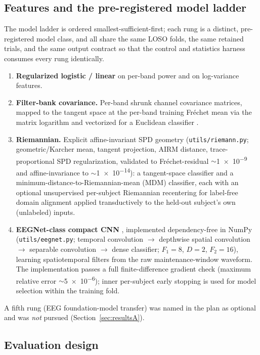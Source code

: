 \documentclass[11pt]{article}
\begin{document}
\subsection{Features and the pre-registered model ladder}
\label{sec:methods-models}
The model ladder is ordered smallest-sufficient-first; each rung is a distinct, pre-registered
model class, and all share the same LOSO folds, the same retained trials, and the same output
contract so that the control and statistics harness consumes every rung identically.
\begin{enumerate}[nosep]
  \item \textbf{Regularized logistic / linear} on per-band power and on log-variance features.
  \item \textbf{Filter-bank covariance.} Per-band shrunk channel covariance matrices, mapped to the
  tangent space at the per-band training Fr\'echet mean via the matrix logarithm and vectorized
  for a Euclidean classifier \cite{barachant2012multiclass}.
  \item \textbf{Riemannian.} Explicit affine-invariant SPD geometry (\texttt{utils/riemann.py};
  geometric/Karcher mean, tangent projection, AIRM distance, trace-proportional SPD
  regularization, validated to Fr\'echet-residual $\sim$\num{1e-9} and affine-invariance to
  $\sim$\num{1e-14}): a tangent-space classifier and a minimum-distance-to-Riemannian-mean (MDM)
  classifier, each with an optional unsupervised per-subject Riemannian recentering for label-free
  domain alignment \cite{zanini2018transfer} applied transductively to the held-out subject's own
  (unlabeled) inputs.
  \item \textbf{EEGNet-class compact CNN} \cite{lawhern2018eegnet}, implemented dependency-free in
  NumPy (\texttt{utils/eegnet.py}; temporal convolution $\rightarrow$ depthwise spatial convolution
  $\rightarrow$ separable convolution $\rightarrow$ dense classifier; $F_1=8$, $D=2$, $F_2=16$),
  learning spatiotemporal filters from the raw maintenance-window waveform. The implementation
  passes a full finite-difference gradient check (maximum relative error $\sim$\num{5e-6}); inner
  per-subject early stopping is used for model selection within the training fold.
\end{enumerate}
A fifth rung (EEG foundation-model transfer) was named in the plan as optional and was \emph{not}
pursued (Section~\ref{sec:resultsA}).

\subsection{Evaluation design}
\label{sec:eval}
\end{document}
